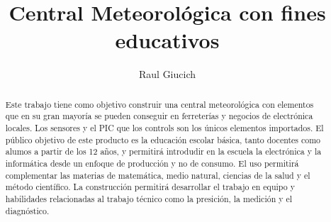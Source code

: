 \documentclass[11pt, spanish]{report}
\title{Central Meteorológica con fines educativos}
\author{Raul Giucich}
\begin{document}
\maketitle

\begin{abstract}
Este trabajo tiene como objetivo construir una central meteorológica con elementos que en su gran mayoría se pueden conseguir en ferreterías y negocios de electrónica locales. Los sensores y el PIC que los controls son los únicos elementos importados.
El público objetivo de este producto es la educación escolar básica, tanto docentes como alumos a partir de los 12 años, y permitirá introdudir en la escuela la electrónica y la informática desde un enfoque de producción y no de consumo. El uso permitirá complementar las materias de matemática, medio natural, ciencias de la salud y el método científico. La construcción permitirá desarrollar el trabajo en equipo y habilidades relacionadas al trabajo técnico como la presición, la medición y el diagnóstico.
\end{abstract}
\end{document}
